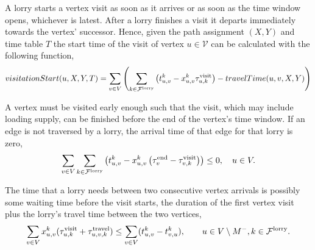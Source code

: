 A lorry starts a vertex visit as soon as it arrives or as soon as the time window opens, whichever is latest.
After a lorry finishes a visit it departs immediately towards the vertex' successor.
Hence, given the path assignment $(X,Y)$ and time table $T$ the start time of the visit of vertex $u \in \mathcal V$ can be calculated with the following function,
\begin{align}
  visitationStart(u,X,Y,T) =
  \sum_{v \in V}
  \left(
  \sum_{k \in \mathcal F^{\rm lorry}}
  \left(
  t_{u,v}^k -
  x^k_{u,v}
   \tau_{u,k}^{\rm visit}
   \right)
  -
  travelTime(u,v,X,Y)
  \right)
  \notag
\end{align}


A vertex must be visited early enough such that the visit, which may include loading supply, can be finished before the end of the vertex's time window. If an edge is not traversed by a lorry, the arrival time of that edge for that lorry is zero,
\begin{align}
  \label{eq:time-window}
    \sum_{v \in V} \sum_{k \in \mathcal F^{\rm lorry}}
    \left( t^k_{u,v}  -
     x^{k}_{u,v} \left(
    \tau^{\rm end}_v - \tau^{\rm visit}_{v,k}
    \right)  \right) \leq 0,
    \quad
    u \in  V .
  \end{align}

The time that a lorry needs between two consecutive vertex arrivals is possibly some waiting time before the visit starts, the duration of the first vertex visit plus the lorry's travel time between the two vertices,
\begin{align}
  \label{eq:time-hard-first}
  \sum_{v\in V} x_{u,v}^k (\tau_{u,k}^{\rm visit} + \tau_{u,v,k}^{\rm travel}) \leq \sum_{v \in V} (t_{u,v}^k - t_{v,u}^k),
  \qquad u\in V \setminus M^-, k \in \mathcal{F}^{\rm lorry}.
\end{align}




